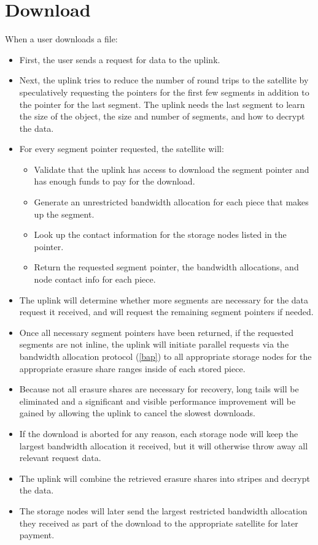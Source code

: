 \documentclass[11pt,fleqn,openany]{book}
\begin{document}
\section{Download}

When a user downloads a file:

\begin{itemize}
\item First, the user sends a request for data to the uplink.
\item Next, the uplink tries to reduce the number of round trips to the satellite
  by speculatively requesting the pointers for the first few segments in
  addition to the pointer for the last segment. The uplink needs the last
  segment to learn the size of the object, the size and number of segments,
  and how to decrypt the data.
\item For every segment pointer requested, the satellite will:
  \begin{itemize}
  \item Validate that the uplink has access to download the segment pointer
    and has enough funds to pay for the download.
  \item Generate an unrestricted bandwidth allocation for each piece that
    makes up the segment.
  \item Look up the contact information for the storage nodes listed in the
  pointer.
  \item Return the requested segment pointer, the bandwidth allocations, and
    node contact info for each piece.
  \end{itemize}
\item The uplink will determine whether more segments are necessary for the
  data request it received, and will request the remaining segment pointers if needed.
\item Once all necessary segment pointers have been returned, if the requested
  segments are not inline, the uplink will initiate parallel requests
  via the bandwidth allocation protocol (\ref{bap}) to all appropriate storage
  nodes for the appropriate erasure share ranges inside of each stored piece.
\item Because not all erasure shares are necessary for recovery, long tails
  will be eliminated and a significant and visible performance improvement will
  be gained by allowing the uplink to cancel the slowest downloads.
\item If the download is aborted for any reason, each storage node will keep the
  largest bandwidth allocation it received, but it will otherwise throw away all
  relevant request data.
\item The uplink will combine the retrieved erasure shares into stripes and
  decrypt the data.
\item The storage nodes will later send the largest restricted
  bandwidth allocation they received as part of the download to the appropriate
  satellite for later payment.
\end{itemize}
\end{document}
